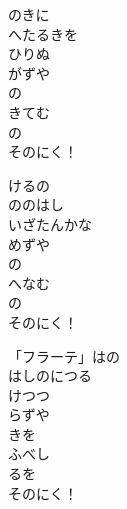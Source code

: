 \documentclass[10pt,b5j]{tarticle} %
\begin{document}
\vspace{1.5em} %
\newcommand{\linespace}{0.5em} %
\newcommand{\blocksize}{0.5\hsize} %
\begin{enumerate} %
    \begin{minipage}[c]{\blocksize}
    
        \vspace{\linespace}
        \item
        のきに\\
        へたるきを\\
        ひりぬ\\
        がずや\\
        の\\
        きてむ\\
        の\\
        そのにく！
        
        \vspace{\linespace}
        \item
        けるの\\
        ののはし\\
        いざたんかな\\
        めずや\\
        の\\
        へなむ\\
        の\\
        そのにく！
        
        \vspace{\linespace}
        \item
        「フラーテ」はの\\
        はしのにつる\\
        けつつ\\
        らずや\\
        きを\\
        ふべし\\
        るを\\
        そのにく！
    
    \end{minipage}
\end{enumerate} %
\end{document}

